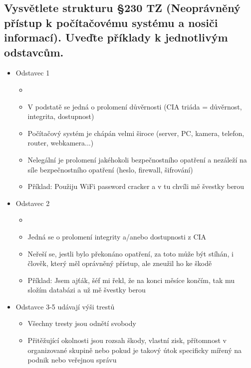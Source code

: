 \subsection{Vysvětlete strukturu §230 TZ (Neoprávněný přístup k počítačovému systému a nosiči informací). Uveďte příklady k jednotlivým odstavcům.}
\begin{itemize}
    \item Odstavec 1
          \begin{itemize}
              \item \textit{}
              \item V podstatě se jedná o prolomení důvěrnosti (CIA triáda = důvěrnost, integrita, dostupnost)
              \item Počítačový systém je chápán velmi široce (server, PC, kamera, telefon, router, webkamera...)
              \item Nelegální je prolomení jakéhokoli bezpečnostního opatření a nezáleží na síle bezpečnostního opatření (heslo, firewall, šifrování)
              \item Příklad: Použiju WiFi password cracker a v tu chvíli mě švestky berou
          \end{itemize}
    \item Odstavec 2
          \begin{itemize}
              \item \textit{}
              \item Jedná se o prolomení integrity a/anebo dostupnosti z CIA
              \item Neřeší se, jestli bylo překonáno opatření, za toto může být stíhán, i člověk, který měl oprávněný přístup, ale zneužil ho ke škodě
              \item Příklad: Jsem ajťák, šéf mi řekl, že na konci měsíce končím, tak mu složím databázi a už mě švestky berou
          \end{itemize}
    \item Odstavce 3-5 udávají výši trestů
          \begin{itemize}
              \item Všechny tresty jsou odnětí svobody
              \item Přitěžující okolnosti jsou rozsah škody, vlastní zisk, přítomnost v organizované skupině nebo pokud je takový útok specificky mířený na podnik nebo veřejnou správu
          \end{itemize}
\end{itemize}


